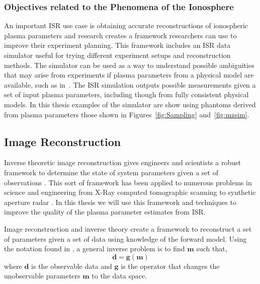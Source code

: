 
\subsubsection{Objectives related to the Phenomena of the Ionosphere}
An important ISR use case is obtaining accurate reconstructions of ionospheric plasma parameters and research creates a framework researchers can use to improve their experiment planning. This framework includes an ISR data simulator useful for trying different experiment setups and reconstruction methods. The simulator can be used as a way to understand possible ambiguities that may arise from experiments if plasma parameters from a physical model are available, such as in~\citet{Perry:2015jf}. The ISR simulation outputs possible measurements given a set of input plasma parameters, including though from fully consistent physical models. In this thesis examples of the simulator are show using phantoms derived from plasma parameters those shown in Figures~\ref{fig:Sampling} and~\ref{fig:mzsim}. 


\subsection{Image Reconstruction}
\label{sec:imgrec}
Inverse theoretic image reconstruction gives engineers and scientists a robust framework to determine the state of system parameters given a set of observations \citep{menke2012geophysical,Vogel:2002:CMI:581830,Karl:2005jy}. This sort of framework has been applied to numerous problems in science and engineering from X-Ray computed tomographic scanning \citep{kak1988principles} to synthetic aperture radar \citep{1456966}. In this thesis we will use this framework and techniques to improve the quality of the plasma parameter estimates from ISR.

Image reconstruction and inverse theory create a framework to reconstruct a set of parameters given a set of data using knowledge of the forward model. Using the notation found in \citet{menke2012geophysical}, a general inverse problem is to find $\mathbf{m}$ such that,
\begin{equation}
\label{eqn:invprob}
\mathbf{d}=\mathbf{g}(\mathbf{m})
\end{equation}
where $\mathbf{d}$ is the observable data and $\mathbf{g}$ is the operator that changes the unobservable parameters $\mathbf{m}$ to the data space. 

